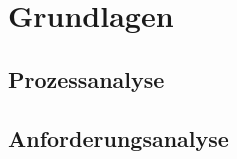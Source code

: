 \section{Grundlagen}\label{sec:grundlagen}
   \subsection{Prozessanalyse}\label{subsec:prozessanalyse}
   \subsection{Anforderungsanalyse}\label{subsec:anforderungsanalyse}